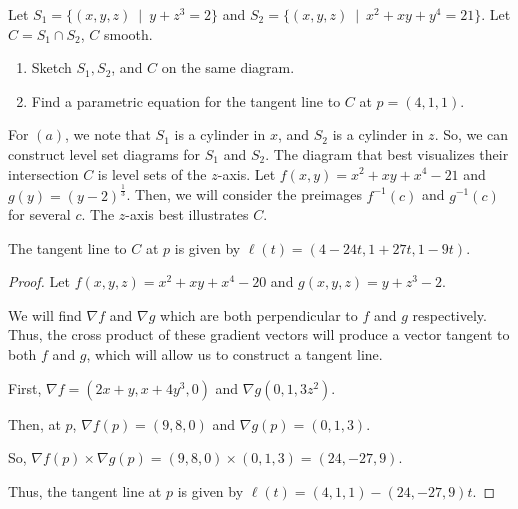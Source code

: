 \documentclass[../hw4]{subfiles}
\begin{document}
\begin{problem}[5]
Let $S_1=\{(x,y,z)\ \mid\ y + z^3=2\} $ and $S_2=\{(x,y,z)\ \mid\ x^2 + xy + y^4=21\} $. Let $C = S_1\cap S_2$, $C$ smooth.
\begin{enumerate}[label=(\alph*)]
	\item Sketch $S_1,S_2$, and $C$ on the same diagram.
	\item Find a parametric equation for the tangent line to $C$ at $p=(4,1,1)$.
\end{enumerate}
\end{problem}

For $(a)$, we note that $S_1$ is a cylinder in $x$, and  $S_2$ is a cylinder in $z$.  So, we can construct level set diagrams for $S_1$ and $S_2$. The diagram that best visualizes their intersection $C$ is level sets of the $z$-axis. Let $f(x,y)=x^2 + xy + x^4 - 21$ and $g(y)={(y-2)}^{\frac{1}{3}}$. Then, we will consider the preimages $f^{-1}(c)$ and $ g^{-1}(c)$ for several $c$. The $z$-axis best illustrates  $C$.
\begin{proposition}[b]
	The tangent line to $C$ at $p$ is given by $\ell(t)=(4-24t,1+27t,1-9t)$.
\end{proposition}
\begin{proof}
	Let $f(x,y,z)=x^2 +xy + x^4 - 20$ and $g(x,y,z)=y+z^3-2$.

	We will find $\nabla f$ and $\nabla g$ which are both perpendicular to $f$ and $g$ respectively. Thus, the cross product of these gradient vectors will produce a vector tangent to both  $f$ and  $g$, which will allow us to construct a tangent line.

	First, $\nabla f= (2x + y, x + 4y^3, 0)$ and $\nabla g(0, 1, 3z^2)$.

	Then, at $p$, $\nabla f(p) = (9,8,0)$ and $\nabla g(p) = (0,1,3)$.

	So, $\nabla f(p) \times \nabla g(p) = (9,8,0)\times (0,1,3) = (24,-27,9)$.

	Thus, the tangent line at $p$ is given by  $\ell(t)=(4,1,1)-(24,-27,9)t$.
\end{proof}
\end{document}
